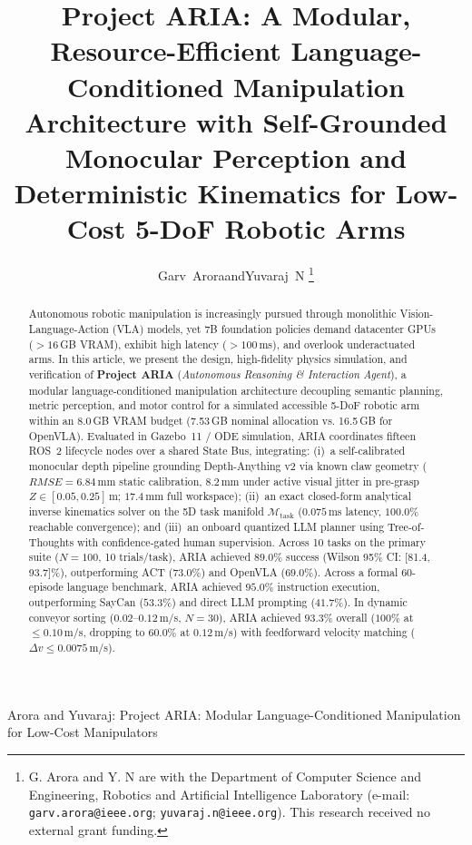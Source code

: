 \documentclass[journal]{IEEEtran}
\begin{document}
\title{Project ARIA: A Modular, Resource-Efficient Language-Conditioned Manipulation Architecture with Self-Grounded Monocular Perception and Deterministic Kinematics for Low-Cost 5-DoF Robotic Arms}

\author{Garv~Arora\quad and\quad Yuvaraj~N%
\thanks{G. Arora and Y. N are with the Department of Computer Science and Engineering, Robotics and Artificial Intelligence Laboratory (e-mail: \texttt{garv.arora@ieee.org}; \texttt{yuvaraj.n@ieee.org}). This research received no external grant funding.}%
}

%
{Arora and Yuvaraj: Project ARIA: Modular Language-Conditioned Manipulation for Low-Cost Manipulators}

\maketitle

\begin{abstract}
Autonomous robotic manipulation is increasingly pursued through monolithic Vision-Language-Action (VLA) models, yet 7B foundation policies demand datacenter GPUs ($>16$\,GB VRAM), exhibit high latency ($>100$\,ms), and overlook underactuated arms. In this article, we present the design, high-fidelity physics simulation, and verification of \textbf{Project ARIA} (\textit{Autonomous Reasoning \& Interaction Agent}), a modular language-conditioned manipulation architecture decoupling semantic planning, metric perception, and motor control for a simulated accessible 5-DoF robotic arm within an 8.0\,GB VRAM budget (7.53\,GB nominal allocation vs. 16.5\,GB for OpenVLA). Evaluated in Gazebo~11 / ODE simulation, ARIA coordinates fifteen ROS~2 lifecycle nodes over a shared State Bus, integrating: (i)~a self-calibrated monocular depth pipeline grounding Depth-Anything v2 via known claw geometry ($RMSE = 6.84$\,mm static calibration, $8.2$\,mm under active visual jitter in pre-grasp $Z \in [0.05, 0.25]$\,m; $17.4$\,mm full workspace); (ii)~an exact closed-form analytical inverse kinematics solver on the 5D task manifold $\mathcal{M}_{\text{task}}$ ($0.075$\,ms latency, $100.0\%$ reachable convergence); and (iii)~an onboard quantized LLM planner using Tree-of-Thoughts with confidence-gated human supervision. Across 10 tasks on the primary suite ($N=100$, 10 trials/task), ARIA achieved $89.0\%$ success (Wilson 95\% CI: [81.4, 93.7]\%), outperforming ACT ($73.0\%$) and OpenVLA ($69.0\%$). Across a formal 60-episode language benchmark, ARIA achieved $95.0\%$ instruction execution, outperforming SayCan ($53.3\%$) and direct LLM prompting ($41.7\%$). In dynamic conveyor sorting ($0.02\text{--}0.12$\,m/s, $N=30$), ARIA achieved $93.3\%$ overall ($100\%$ at $\le 0.10$\,m/s, dropping to $60.0\%$ at $0.12$\,m/s) with feedforward velocity matching ($\Delta v \le 0.0075$\,m/s).
\end{abstract}
\end{document}
